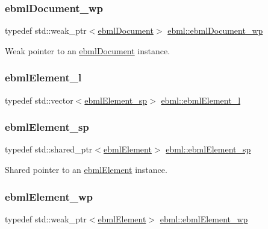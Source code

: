 \subsubsection{\texorpdfstring{ebml\+Document\+\_\+wp}{ebmlDocument\_wp}}
{\footnotesize\ttfamily typedef std\+::weak\+\_\+ptr$<$\mbox{\hyperlink{classebml_1_1ebmlDocument}{ebml\+Document}}$>$ \mbox{\hyperlink{namespaceebml_acfead4f724a6f8d55c730c6fbd362cea}{ebml\+::ebml\+Document\+\_\+wp}}}

Weak pointer to an \mbox{\hyperlink{classebml_1_1ebmlDocument}{ebml\+Document}} instance. \mbox{\label{namespaceebml_a1ddadd26791f273d851882653b9caf70}} 
\subsubsection{\texorpdfstring{ebml\+Element\+\_\+l}{ebmlElement\_l}}
{\footnotesize\ttfamily typedef std\+::vector$<$\mbox{\hyperlink{namespaceebml_adad533b7705a16bb360fe56380c5e7be}{ebml\+Element\+\_\+sp}}$>$ \mbox{\hyperlink{namespaceebml_a1ddadd26791f273d851882653b9caf70}{ebml\+::ebml\+Element\+\_\+l}}}

\mbox{\label{namespaceebml_adad533b7705a16bb360fe56380c5e7be}} 
\subsubsection{\texorpdfstring{ebml\+Element\+\_\+sp}{ebmlElement\_sp}}
{\footnotesize\ttfamily typedef std\+::shared\+\_\+ptr$<$\mbox{\hyperlink{classebml_1_1ebmlElement}{ebml\+Element}}$>$ \mbox{\hyperlink{namespaceebml_adad533b7705a16bb360fe56380c5e7be}{ebml\+::ebml\+Element\+\_\+sp}}}

Shared pointer to an \mbox{\hyperlink{classebml_1_1ebmlElement}{ebml\+Element}} instance. \mbox{\label{namespaceebml_a495fb58b42b0050d887415351af02935}} 
\subsubsection{\texorpdfstring{ebml\+Element\+\_\+wp}{ebmlElement\_wp}}
{\footnotesize\ttfamily typedef std\+::weak\+\_\+ptr$<$\mbox{\hyperlink{classebml_1_1ebmlElement}{ebml\+Element}}$>$ \mbox{\hyperlink{namespaceebml_a495fb58b42b0050d887415351af02935}{ebml\+::ebml\+Element\+\_\+wp}}}

